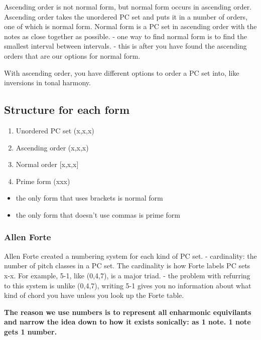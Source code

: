 \documentclass{book}
\providecommand{\tightlist}{%
  \setlength{\itemsep}{0pt}\setlength{\parskip}{0pt}}
\begin{document}
Ascending order is not normal form, but normal form occurs in ascending order.
Ascending order takes the unordered PC set and puts it in a number of orders,
one of which is normal form. Normal form is a PC set in ascending order with
the notes as close together as possible. - one way to find normal form is to
find the smallest interval between intervals. - this is after you have found
the ascending orders that are our options for normal form.

With ascending order, you have different options to order a PC set into, like
inversions in tonal harmony.

\hypertarget{structure-for-each-form}{%
\subsection{Structure for each form}\label{structure-for-each-form}}

\begin{enumerate}
\def\labelenumi{\arabic{enumi}.}
\tightlist
\item
  Unordered PC set (x,x,x)
\item
  Ascending order (x,x,x)
\item
  Normal order {[}x,x,x{]}
\item
  Prime form (xxx)
\end{enumerate}

\begin{itemize}
\tightlist
\item
  the only form that uses brackets is normal form
\item
  the only form that doesn't use commas is prime form
\end{itemize}

\hypertarget{allen-forte}{%
\subsubsection{Allen Forte}\label{allen-forte}}

Allen Forte created a numbering system for each kind of PC set. - cardinality:
the number of pitch classes in a PC set. The cardinality is how Forte labels
PC sets x-x. For example, 5-1, like (0,4,7), is a major triad. - the problem
with refurring to this system is unlike (0,4,7), writing 5-1 gives you no
information about what kind of chord you have unless you look up the Forte
table.

\textbf{The reason we use numbers is to represent all enharmonic equivilants
and narrow the idea down to how it exists sonically: as 1 note. 1 note gets 1
number.}
\end{document}
